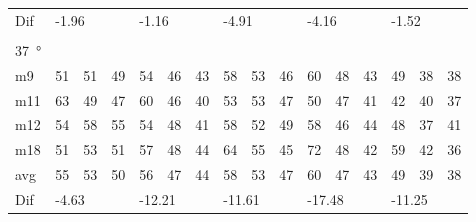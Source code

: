 \begin{table}[H]
\begin{tabular}{l|l|l|l|l|l|l|l|l|l|l|l|l|lll}
Dif & \multicolumn{3}{l|}{-1.96} & \multicolumn{3}{l|}{-1.16} & \multicolumn{3}{l|}{-4.91} & \multicolumn{3}{l|}{-4.16} & \multicolumn{3}{l}{-1.52}  \\ 
 \multicolumn{16}{l}{ } \\                         
\SI{37}{\degree}   & \multicolumn{3}{l|}{} & \multicolumn{3}{l|}{} & \multicolumn{3}{l|}{} & \multicolumn{3}{l|}{} & \multicolumn{3}{l}{}   \\  \hline
m9    &  51    &  51    &  49    &  54    &  46    &   43   &  58    &   53    &  46    &   60    &   48   &   43   & \multicolumn{1}{l|}{49} & \multicolumn{1}{l|}{38} & 38 \\
m11  &  63    &  49    &  47    &   60   &   46   &   40   &  53    &   53    &  47    &    50   &   47   &  41   & \multicolumn{1}{l|}{42} & \multicolumn{1}{l|}{40} & 37 \\
m12  &  54    &   58   &  55    &  54    &   48   &   41   &   58   &  52     &   49   &    58   &   46   &   44   & \multicolumn{1}{l|}{48} & \multicolumn{1}{l|}{37} & 41 \\
m18  &  51    &   53   &  51    &   57   &  48    &   44   &   64   &   55    &  45    &    72   &  48    &   42   & \multicolumn{1}{l|}{59} & \multicolumn{1}{l|}{42} & 36 \\ \hline
avg &  55    &  53    &  50    &  56    & 47     &  44    &   58   &  53     &  47    &  60     &   47   &  43    & \multicolumn{1}{l|}{49} & \multicolumn{1}{l|}{39}  & 38 \\ \hline  
Dif & \multicolumn{3}{l|}{-4.63} & \multicolumn{3}{l|}{-12.21} & \multicolumn{3}{l|}{-11.61} & \multicolumn{3}{l|}{-17.48} & \multicolumn{3}{l}{-11.25}                                
\end{tabular}
\end{table}


